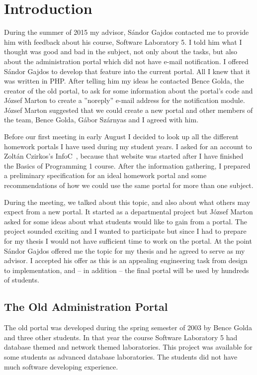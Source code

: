 \chapter{Introduction}

During the summer of 2015 my advisor, Sándor Gajdos contacted me to provide him with feedback about his course, Software Laboratory 5. I told him what I thought was good and bad in the subject, not only about the tasks, but also about the administration portal which did not have e-mail notification. I offered Sándor Gajdos to develop that feature into the current portal. All I knew that it was written in PHP. After telling him my ideas he contacted Bence Golda, the creator of the old portal, to ask for some information about the portal's code and József Marton to create a ''noreply'' e-mail address for the notification module. József Marton suggested that we could create a new portal and other members of the team, Bence Golda, Gábor Szárnyas and I agreed with him. 

Before our first meeting in early August I decided to look up all the different homework portals I have used during my student years. I asked for an account to Zoltán Czirkos's InfoC~\cite{InfoC}, because that website was started after I have finished the Basics of Programming 1 course. After the information gathering, I prepared a preliminary specification for an ideal homework portal and some recommendations of how we could use the same portal for more than one subject.

During the meeting, we talked about this topic, and also about what others may expect from a new portal. It started as a departmental project but József Marton asked for some ideas about what students would like to gain from a portal. The project sounded exciting and I wanted to participate but since I had to prepare for my thesis I would not have sufficient time to work on the portal. At the point Sándor Gajdos offered me the topic for my thesis and he agreed to serve as my advisor. I accepted his offer as this is an appealing engineering task from design to implementation, and -- in addition -- the final portal will be used by hundreds of students.


\section{The Old Administration Portal} 
The old portal was developed during the spring semester of 2003 by Bence Golda and three other students. In that year the course Software Laboratory 5 had database themed and network themed laboratories. This project was available for some students as advanced database laboratories. The students did not have much software developing experience. 

